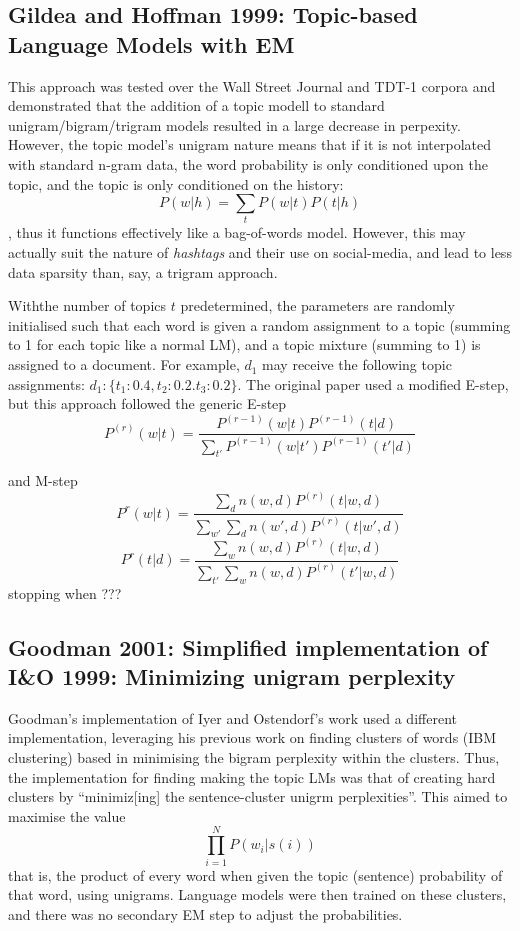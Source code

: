 \documentclass{article}
\begin{document}
\subsection{Gildea and Hoffman 1999: Topic-based Language Models with EM}
This approach was tested over the Wall Street Journal and TDT-1 corpora and demonstrated that the addition of a topic modell to standard unigram/bigram/trigram models resulted in a large decrease in perpexity. However, the topic model's unigram nature means that if it is not interpolated with standard n-gram data, the word probability is only conditioned upon the topic, and the topic is only conditioned on the history:
$$P(w|h) = \sum_{t}P(w|t)P(t|h)$$,
thus it functions effectively like a bag-of-words model. However, this may actually suit the nature of \textit{hashtags} and their use on social-media, and lead to less data sparsity than, say, a trigram approach.

Withthe number of topics $t$ predetermined, the parameters are randomly initialised such that each word is given a random assignment to a topic (summing to 1 for each topic like a normal LM), and a topic mixture (summing to 1) is assigned to a document. For example, $d_1$ may receive the following topic assignments: $d_1: \{t_1:0.4, t_2: 0.2. t_3: 0.2\}$.
The original paper used a modified E-step, but this approach followed the generic E-step
\begin{equation}
P^{(r)}(w|t) = \frac{P^{(r-1)}(w|t)P^{(r-1)}(t|d)}{\sum_{t'}P^{(r-1)}(w|t')P^{(r-1)}(t'|d)}
\end{equation}

and M-step
\begin{equation}
P^{r}(w|t) = \frac{\sum_{d}n(w,d)P^{(r)}(t|w,d)}{\sum_{w'}\sum_{d}n(w',d)P^{(r)}(t|w',d)}
\end{equation}
\begin{equation}
P^{r}(t|d) = \frac{\sum_{w}n(w,d)P^{(r)}(t|w,d)}{\sum_{t'}\sum_{w}n(w,d)P^{(r)}(t'|w,d)}
\end{equation}
stopping when ??? %


\subsection{Goodman 2001: Simplified implementation of I\&O 1999: Minimizing unigram perplexity} \label{sec:goodman}
Goodman's implementation of Iyer and Ostendorf's work used a different implementation, leveraging his previous work on finding clusters of words (IBM clustering) based in minimising the bigram perplexity within the clusters. Thus, the implementation for finding making the topic LMs was that of creating hard clusters by ``minimiz[ing] the sentence-cluster unigrm perplexities''. This aimed to maximise the value
$$\prod_{i=1}^{N}P(w_i|s(i))$$
that is, the product of every word when given the topic (sentence) probability of that word, using unigrams. Language models were then trained on these clusters, and there was no secondary EM step to adjust the probabilities.
\end{document}
